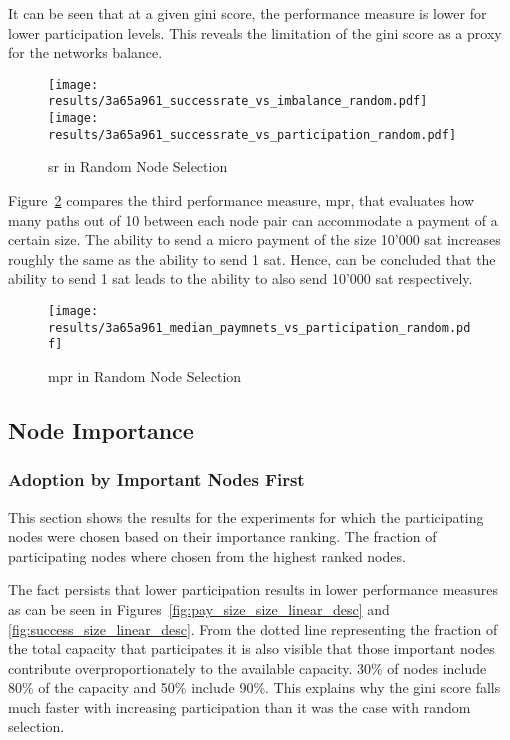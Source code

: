 \documentclass[final]{fhnwreport}       %
\begin{document}
It can be seen that at a given \gls{gini} score, the performance measure is lower for lower participation levels. This reveals the limitation of the \gls{gini} score as a \gls{proxy} for the networks balance.

\begin{figure}[htp]
\centering
\texttt{[image: results/3a65a961\_successrate\_vs\_imbalance\_random.pdf]}\hfill
\texttt{[image: results/3a65a961\_successrate\_vs\_participation\_random.pdf]}
\caption{\gls{sr} in Random Node Selection}
\label{fig:success_random}
\end{figure}

Figure~\ref{fig:sizes_random} compares the third performance measure, \gls{mpr}, that evaluates how many paths out of 10 between each node pair can accommodate a payment of a certain size. The ability to send a micro payment of the size 10'000 sat increases roughly the same as the ability to send 1 sat. Hence, can be concluded that the ability to send 1 sat leads to the ability to also send 10'000 sat respectively. 

\begin{figure}[htp]
\centering
\texttt{[image: results/3a65a961\_median\_paymnets\_vs\_participation\_random.pdf]}
\caption{\gls{mpr} in Random Node Selection}
\label{fig:sizes_random}
\end{figure}

\subsection{Node Importance}
\subsubsection{Adoption by Important Nodes First}\label{subsub:desc}
This section shows the results for the experiments for which the participating nodes were chosen based on their importance ranking. The fraction of participating nodes where chosen from the highest ranked nodes. 

The fact persists that lower participation results in lower performance measures as can be seen in Figures~\ref{fig:pay_size_size_linear_desc} and \ref{fig:success_size_linear_desc}. From the dotted line representing the fraction of the total capacity that participates it is also visible that those important nodes contribute overproportionately to the available capacity. 30\% of nodes include 80\% of the capacity and 50\% include 90\%. This explains why the \gls{gini} score falls much faster with increasing participation than it was the case with random selection.
\end{document}

